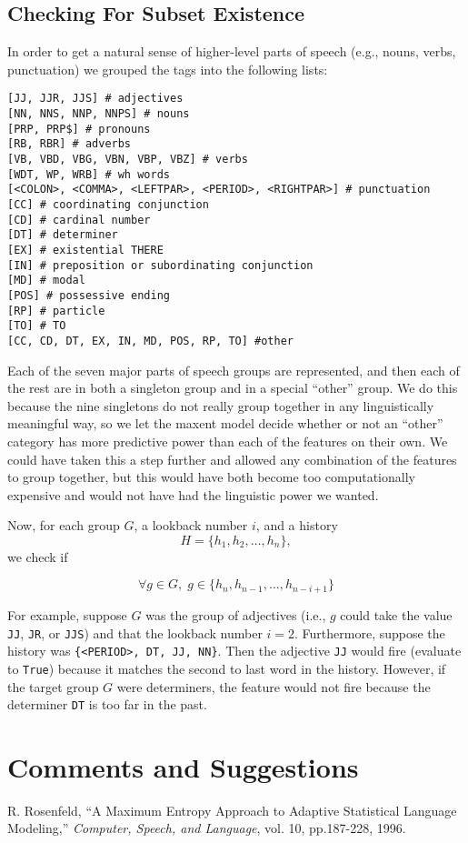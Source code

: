 \documentclass[11pt]{article}
\begin{document}
\subsection{Checking For Subset Existence}

In order to get a natural sense of higher-level parts of speech (e.g., nouns, verbs, punctuation) we grouped the tags into the following lists:

\begin{verbatim}
[JJ, JJR, JJS] # adjectives
[NN, NNS, NNP, NNPS] # nouns
[PRP, PRP$] # pronouns
[RB, RBR] # adverbs
[VB, VBD, VBG, VBN, VBP, VBZ] # verbs
[WDT, WP, WRB] # wh words
[<COLON>, <COMMA>, <LEFTPAR>, <PERIOD>, <RIGHTPAR>] # punctuation
[CC] # coordinating conjunction
[CD] # cardinal number
[DT] # determiner
[EX] # existential THERE
[IN] # preposition or subordinating conjunction
[MD] # modal
[POS] # possessive ending
[RP] # particle
[TO] # TO
[CC, CD, DT, EX, IN, MD, POS, RP, TO] #other
\end{verbatim}

Each of the seven major parts of speech groups are represented, and then each
of the rest are in both a singleton group and in a special ``other'' group. We
do this because the nine singletons do not really group together in any
linguistically meaningful way, so we let the maxent model decide whether or
not an ``other'' category has more predictive power than each of the features
on their own. We could have taken this a step further and allowed any
combination of the features to group together, but this would have both become
too computationally expensive and would not have had the linguistic power we
wanted.

Now, for each group $G$, a lookback number $i$, and a history \[ H = \{h_1,
h_2, \dots, h_n\},\] we check if

\[ \forall g \in G,\; g \in \{h_{n}, h_{n-1}, \ldots, h_{n-i+1}\}  \]

For example, suppose $G$ was the group of adjectives (i.e., $g$ could take the
value \texttt{JJ}, \texttt{JR}, or \texttt{JJS}) and that the lookback number
$i = 2$. Furthermore, suppose the history was \texttt{\{<PERIOD>, DT, JJ,
NN\}}. Then the adjective \texttt{JJ} would fire (evaluate to \texttt{True})
because it matches the second to last word in the history. However, if the
target group $G$ were determiners, the feature would not fire because the
determiner \texttt{DT} is too far in the past.

\section{Comments and Suggestions}


\begin{thebibliography}{}

R. Rosenfeld,
``A Maximum Entropy Approach to Adaptive Statistical Language Modeling,''
{\em Computer, Speech, and Language}, vol. 10, pp.187-228, 1996.

\end{thebibliography}
\end{document}

